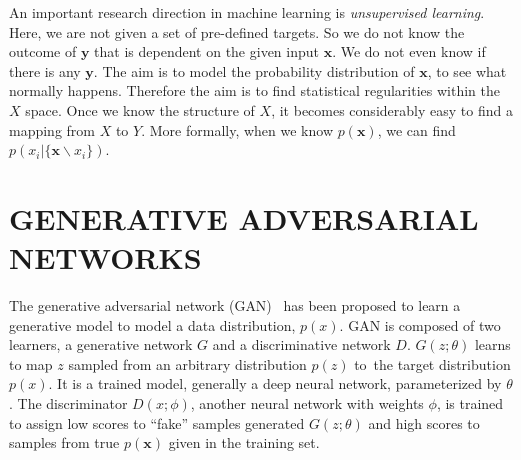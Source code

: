 \documentclass[a4paper,onesided,12pt]{report}
\begin{document}
An important research direction in machine learning is \emph{unsupervised learning}. Here, we are not given a set of pre-defined targets. So we do not know the outcome of $\boldsymbol{y}$ that is dependent on the given input $\boldsymbol{x}$. We do not even know if there is any $\boldsymbol{y}$. The aim is to model the probability distribution of $\boldsymbol{x}$, to see what normally happens. Therefore the aim is to find statistical regularities within the $X$ space. Once we know the structure of $X$, it becomes considerably easy to find a mapping from $X$ to $Y$. More formally, when we know $p(\boldsymbol{x})$, we can find $p(x_i | \{\boldsymbol{x} \backslash x_i\})$.





\chapter{GENERATIVE ADVERSARIAL NETWORKS}
\label{chapter:gan}

The generative adversarial network (GAN) \cite{gan}~has been proposed to learn a generative model to model a data distribution, $p(x)$. GAN is composed of two learners, a generative network $G$ and a discriminative network $D$. $G(z;\theta)$ learns to map $z$ sampled from an arbitrary distribution $p(z)$ to~the target distribution $p(x)$. It is a trained model, generally a deep neural network, parameterized by $\theta$. The discriminator $D(x;\phi)$, another neural network with weights $\phi$, is trained to assign low scores to ``fake'' samples generated $G(z;\theta)$ and high scores to samples from true $p(\boldsymbol{x})$ given in the training set.
\end{document}
